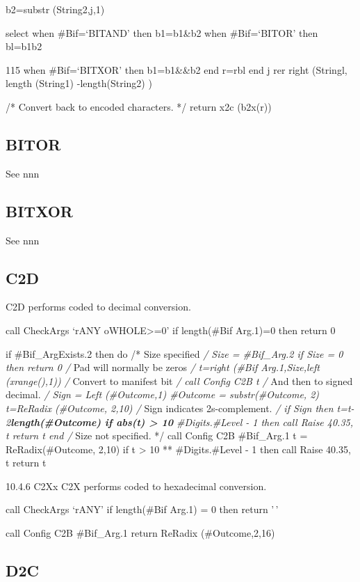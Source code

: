 b2=substr (String2,j,1)

select when \#Bif=`BITAND' then b1=b1\&b2 when \#Bif=`BITOR' then
bl=b1\textbar b2

115 when \#Bif=`BITXOR' then b1=b1\&\&b2 end r=r\textbar\textbar bl end
j rer \textbar\textbar{} right (Stringl, length (String1)
-length(String2) )

/* Convert back to encoded characters. */ return x2c (b2x(r))

\subsection{BITOR}\label{bitor}

See nnn

\subsection{BITXOR}\label{bitxor}

See nnn

\subsection{C2D}\label{c2d}

C2D performs coded to decimal conversion.

call CheckArgs `rANY oWHOLE\textgreater=0' if length(\#Bif Arg.1)=0 then
return 0

if \#Bif\_ArgExists.2 then do /* Size specified \emph{/ Size =
\#Bif\_Arg.2 if Size = 0 then return 0 /} Pad will normally be zeros
\emph{/ t=right (\#Bif Arg.1,Size,left (xrange(),1)) /} Convert to
manifest bit \emph{/ call Config C2B t /} And then to signed decimal.
\emph{/ Sign = Left (\#Outcome,1) \#Outcome = substr(\#Outcome, 2)
t=ReRadix (\#Outcome, 2,10) /} Sign indicates 2s-complement. \emph{/ if
Sign then t=t-2\textbf{length(\#Outcome) if abs(t) \textgreater{} 10 }
\#Digits.\#Level - 1 then call Raise 40.35, t return t end /} Size not
specified. */ call Config C2B \#Bif\_Arg.1 t = ReRadix(\#Outcome, 2,10)
if t \textgreater{} 10 ** \#Digits.\#Level - 1 then call Raise 40.35, t
return t

10.4.6 C2Xx C2X performs coded to hexadecimal conversion.

call CheckArgs `rANY' if length(\#Bif Arg.1) = 0 then return '\,'

call Config C2B \#Bif\_Arg.1 return ReRadix (\#Outcome,2,16)

\subsection{D2C}\label{d2c}

